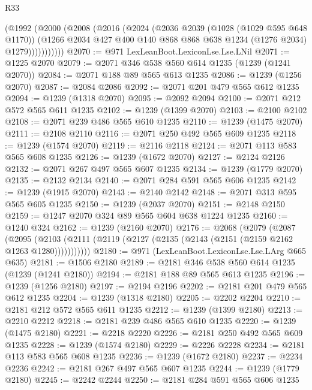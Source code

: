 \begin{lexlean}{R33}
\begin{coremodule}
            (@1992
              (@2000
                (@2008
                  (@2016
                    (@2024
                      (@2036
                        @2039
                        (@1028 (@1029 @595 @648 @1170))
                        (@1266
                          @2034
                          @427
                          @400
                          @140
                          @868
                          @868
                          @638
                          @1234
                          (@1276 @2034)
                          @1279)))))))))))
@2070 := @971 LexLeanBoot.LexiconLse.Lse.LNil
@2071 := @1225 @2070
@2079 := @2071 @346 @538 @560 @614 @1235 (@1239 (@1241 @2070))
@2084 := @2071 @188 @89 @565 @613 @1235
@2086 := @1239 (@1256 @2070)
@2087 := @2084 @2086
@2092 := @2071 @201 @479 @565 @612 @1235
@2094 := @1239 (@1318 @2070)
@2095 := @2092 @2094
@2100 := @2071 @212 @572 @565 @611 @1235
@2102 := @1239 (@1399 @2070)
@2103 := @2100 @2102
@2108 := @2071 @239 @486 @565 @610 @1235
@2110 := @1239 (@1475 @2070)
@2111 := @2108 @2110
@2116 := @2071 @250 @492 @565 @609 @1235
@2118 := @1239 (@1574 @2070)
@2119 := @2116 @2118
@2124 := @2071 @113 @583 @565 @608 @1235
@2126 := @1239 (@1672 @2070)
@2127 := @2124 @2126
@2132 := @2071 @267 @497 @565 @607 @1235
@2134 := @1239 (@1779 @2070)
@2135 := @2132 @2134
@2140 := @2071 @284 @591 @565 @606 @1235
@2142 := @1239 (@1915 @2070)
@2143 := @2140 @2142
@2148 := @2071 @313 @595 @565 @605 @1235
@2150 := @1239 (@2037 @2070)
@2151 := @2148 @2150
@2159 := @1247 @2070 @324 @89 @565 @604 @638 @1224 @1235
@2160 := @1240 @324
@2162 := @1239 (@2160 @2070)
@2176 := @2068
    (@2079
      (@2087
        (@2095 (@2103 (@2111 (@2119 (@2127 (@2135 (@2143 (@2151 (@2159 @2162 @1263 @1280)))))))))))
@2180 := @971 (LexLeanBoot.LexiconLse.Lse.LArg @665 @635)
@2181 := @1506 @2180
@2189 := @2181 @346 @538 @560 @614 @1235 (@1239 (@1241 @2180))
@2194 := @2181 @188 @89 @565 @613 @1235
@2196 := @1239 (@1256 @2180)
@2197 := @2194 @2196
@2202 := @2181 @201 @479 @565 @612 @1235
@2204 := @1239 (@1318 @2180)
@2205 := @2202 @2204
@2210 := @2181 @212 @572 @565 @611 @1235
@2212 := @1239 (@1399 @2180)
@2213 := @2210 @2212
@2218 := @2181 @239 @486 @565 @610 @1235
@2220 := @1239 (@1475 @2180)
@2221 := @2218 @2220
@2226 := @2181 @250 @492 @565 @609 @1235
@2228 := @1239 (@1574 @2180)
@2229 := @2226 @2228
@2234 := @2181 @113 @583 @565 @608 @1235
@2236 := @1239 (@1672 @2180)
@2237 := @2234 @2236
@2242 := @2181 @267 @497 @565 @607 @1235
@2244 := @1239 (@1779 @2180)
@2245 := @2242 @2244
@2250 := @2181 @284 @591 @565 @606 @1235

\end{coremodule}
\end{lexlean}
